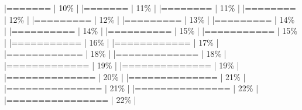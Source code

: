\documentclass[
]{article}
\newenvironment{Shaded}{}{}
\begin{document}
\begin{Shaded}
\begin{Highlighting}[]
|=======                                                               |  10\%  |                                                                              |=======                                                               |  11\%  |                                                                              |========                                                              |  11\%  |                                                                              |========                                                              |  12\%  |                                                                              |=========                                                             |  12\%  |                                                                              |=========                                                             |  13\%  |                                                                              |=========                                                             |  14\%  |                                                                              |==========                                                            |  14\%  |                                                                              |==========                                                            |  15\%  |                                                                              |===========                                                           |  15\%  |                                                                              |===========                                                           |  16\%  |                                                                              |============                                                          |  17\%  |                                                                              |============                                                          |  18\%  |                                                                              |=============                                                         |  18\%  |                                                                              |=============                                                         |  19\%  |                                                                              |==============                                                        |  19\%  |                                                                              |==============                                                        |  20\%  |                                                                              |==============                                                        |  21\%  |                                                                              |===============                                                       |  21\%  |                                                                              |===============                                                       |  22\%  |                                                                              |================                                                      |  22\%  |                                     
\end{Highlighting}
\end{Shaded}
\end{document}
